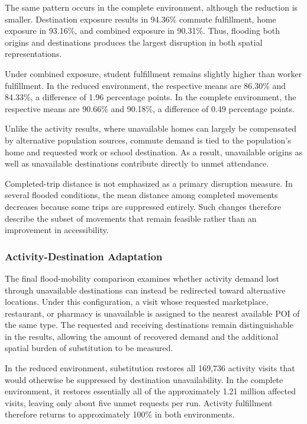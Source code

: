 The same pattern occurs in the complete environment, although the reduction is smaller. Destination exposure results in 94.36\% commute fulfillment, home exposure in 93.16\%, and combined exposure in 90.31\%. Thus, flooding both origins and destinations produces the largest disruption in both spatial representations.

Under combined exposure, student fulfillment remains slightly higher than worker fulfillment. In the reduced environment, the respective means are 86.30\% and 84.33\%, a difference of 1.96 percentage points. In the complete environment, the respective means are 90.66\% and 90.18\%, a difference of 0.49 percentage points. %

Unlike the activity results, where unavailable homes can largely be compensated by alternative population sources, commute demand is tied to the population's home and requested work or school destination. As a result, unavailable origins as well as unavailable destinations contribute directly to unmet attendance.

Completed-trip distance is not emphasized as a primary disruption measure. In several flooded conditions, the mean distance among completed movements decreases because some trips are suppressed entirely. Such changes therefore describe the subset of movements that remain feasible rather than an improvement in accessibility.


\subsubsection{Activity-Destination Adaptation}
\label{sec:flood_destination_adaptation}

The final flood-mobility comparison examines whether activity demand lost through unavailable destinations can instead be redirected toward alternative locations. Under this configuration, a visit whose requested marketplace, restaurant, or pharmacy is unavailable is assigned to the nearest available POI of the same type. The requested and receiving destinations remain distinguishable in the results, allowing the amount of recovered demand and the additional spatial burden of substitution to be measured. %

In the reduced environment, substitution restores all 169,736 activity visits that would otherwise be suppressed by destination unavailability. In the complete environment, it restores essentially all of the approximately 1.21 million affected visits, leaving only about five unmet requests per run. Activity fulfillment therefore returns to approximately 100\% in both environments.

